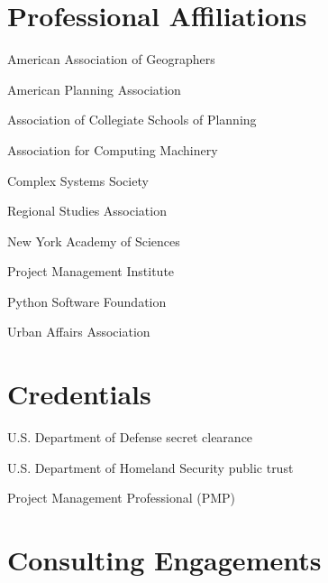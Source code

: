\documentclass[12pt,letterpaper]{report}
\newcommand{\listitemspace}{0.15em}
\renewenvironment{itemize}
{\begin{list}{}{\setlength{\leftmargin}{0em}
			\setlength{\parskip}{0em}
			\setlength{\itemsep}{\listitemspace}
			\setlength{\parsep}{\listitemspace}}}
	{\end{list}}
\begin{document}
	\section*{Professional Affiliations}

	\begin{itemize}

		\item American Association of Geographers

		\item American Planning Association

		\item Association of Collegiate Schools of Planning

		\item Association for Computing Machinery

		\item Complex Systems Society

		\item Regional Studies Association

		\item New York Academy of Sciences

		\item Project Management Institute

		\item Python Software Foundation

		\item Urban Affairs Association

	\end{itemize}



	\section*{Credentials}

	\begin{itemize}

		\item U.S. Department of Defense secret clearance

		\item U.S. Department of Homeland Security public trust

		\item Project Management Professional (PMP)

	\end{itemize}



	\section*{Consulting Engagements}
\end{document}
